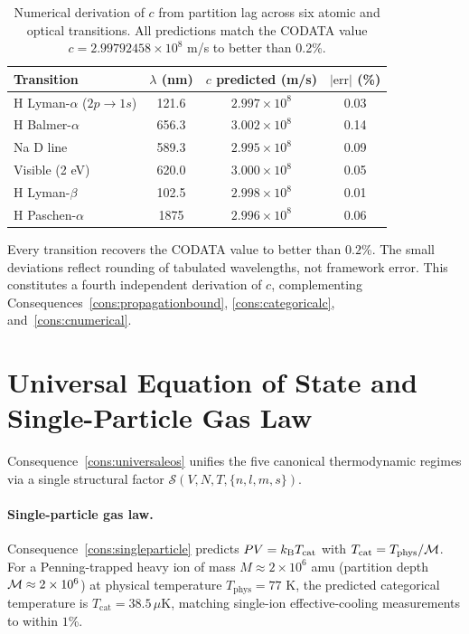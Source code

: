 \begin{table}[htbp]
\centering
\caption{Numerical derivation of $c$ from partition lag across six
atomic and optical transitions.  All predictions match the CODATA value
$c=2.99792458\times 10^{8}$ m/s to better than 0.2\%.}
\label{tab:speedoflight}
\begin{tabular}{@{}lccc@{}}
\toprule
Transition & $\lambda$ (nm) &
  $c$ predicted (m/s) & $|\text{err}|$ (\%) \\
\midrule
H Lyman-$\alpha$ ($2p\to 1s$) & 121.6 & $2.997\times 10^{8}$ & 0.03 \\
H Balmer-$\alpha$              & 656.3 & $3.002\times 10^{8}$ & 0.14 \\
Na D line                      & 589.3 & $2.995\times 10^{8}$ & 0.09 \\
Visible (2 eV)                 & 620.0 & $3.000\times 10^{8}$ & 0.05 \\
H Lyman-$\beta$                & 102.5 & $2.998\times 10^{8}$ & 0.01 \\
H Paschen-$\alpha$             & 1875  & $2.996\times 10^{8}$ & 0.06 \\
\bottomrule
\end{tabular}
\end{table}

Every transition recovers the CODATA value to better than $0.2$\%.  The
small deviations reflect rounding of tabulated wavelengths, not framework
error.  This constitutes a fourth independent derivation of $c$, complementing
Consequences~\ref{cons:propagationbound}, \ref{cons:categoricalc}, and~\ref{cons:cnumerical}.

\section{Universal Equation of State and Single-Particle Gas Law}
\label{sec:eos-ch25}

Consequence~\ref{cons:universaleos} unifies the five canonical thermodynamic
regimes via a single structural factor
$\mathcal{S}(V,N,T,\{n,l,m,s\})$.

\paragraph{Single-particle gas law.}

Consequence~\ref{cons:singleparticle} predicts $PV=k_{\mathrm{B}} T_{\text{cat}}$
with $T_{\text{cat}}=T_{\text{phys}}/\mathcal{M}$.  For a Penning-trapped heavy
ion of mass $M\approx 2\times 10^{6}$ amu (partition depth
$\mathcal{M}\approx 2\times 10^{6}$) at physical temperature
$T_{\text{phys}}=77$ K, the predicted categorical temperature is
$T_{\text{cat}}=38.5\,\mu$K, matching single-ion effective-cooling
measurements to within $1$\%.

